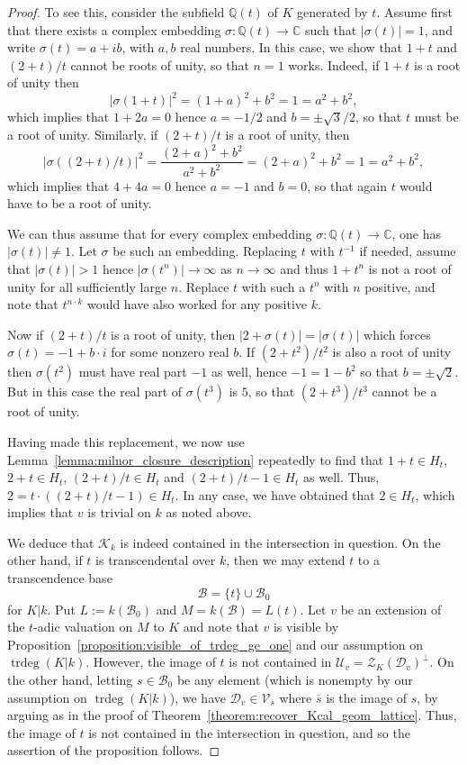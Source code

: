 \documentclass[12pt]{amsart}
\newcommand{\Qbb}{\mathbb{Q}}
\newcommand{\Cbb}{\mathbb{C}}
\newcommand{\trdeg}{\operatorname{trdeg}}
\newcommand{\Bcal}{\mathcal{B}}
\newcommand{\Vscr}{\mathscr{V}}
\newcommand{\Zcal}{\mathcal{Z}}
\newcommand{\Dcal}{\mathcal{D}}
\newcommand{\Ucal}{\mathcal{U}}
\newcommand{\Kcal}{\mathcal{K}}
\renewcommand{\bar}{\overline}
\theoremstyle{definition}
\begin{document}
\begin{proof}
  To see this, consider the subfield $\Qbb(t)$ of $K$ generated by $t$.
  Assume first that there exists a complex embedding $\sigma : \Qbb(t) \to \Cbb$ such that $|\sigma(t)| = 1$, and write $\sigma(t) = a + i b$, with $a,b$ real numbers.
  In this case, we show that $1 + t$ and $(2+t)/t$ cannot be roots of unity, so that $n = 1$ works.
  Indeed, if $1 + t$ is a root of unity then
  \[ |\sigma(1+t)|^{2} = (1+a)^{2} + b^{2} = 1 = a^{2} + b^{2}, \]
  which implies that $1 + 2a = 0$ hence $a = -1/2$ and $b = \pm \sqrt{3}/2$, so that $t$ must be a root of unity.
  Similarly, if $(2+t)/t$ is a root of unity, then
  \[ |\sigma((2+t)/t)|^{2} = \frac{(2+a)^{2} + b^{2}}{a^{2}+b^{2}} = (2+a)^{2} + b^{2} = 1 = a^{2} + b^{2}, \]
  which implies that $4 + 4a = 0$ hence $a = -1$ and $b = 0$, so that again $t$ would have to be a root of unity.

  We can thus assume that for every complex embedding $\sigma : \Qbb(t) \to \Cbb$, one has $|\sigma(t)| \neq 1$.
  Let $\sigma$ be such an embedding.
  Replacing $t$ with $t^{-1}$ if needed, assume that $|\sigma(t)| > 1$ hence $|\sigma(t^{n})| \to \infty$ as $n \to \infty$ and thus $1+t^{n}$ is not a root of unity for all sufficiently large $n$.
  Replace $t$ with such a $t^{n}$ with $n$ positive, and note that $t^{n \cdot k}$ would have also worked for any positive $k$.

  Now if $(2+t)/t$ is a root of unity, then $|2 + \sigma(t)| = |\sigma(t)|$ which forces $\sigma(t) = -1 + b \cdot i$ for some nonzero real $b$.
  If $(2+t^{2})/t^{2}$ is also a root of unity then $\sigma(t^{2})$ must have real part $-1$ as well, hence $-1 = 1 - b^{2}$ so that $b = \pm\sqrt{2}$.
  But in this case the real part of $\sigma(t^{3})$ is $5$, so that $(2 + t^{3})/t^{3}$ cannot be a root of unity.

  Having made this replacement, we now use Lemma~\ref{lemma:milnor_closure_description} repeatedly to find that $1 + t \in H_{t}$, $2 + t \in H_{t}$, $(2+t)/t \in H_{t}$ and $(2+t)/t-1 \in H_{t}$ as well.
  Thus, $2 = t \cdot ((2+t)/t - 1) \in H_{t}$.
  In any case, we have obtained that $2 \in H_{t}$, which implies that $v$ is trivial on $k$ as noted above.

  We deduce that $\Kcal_{k}$ is indeed contained in the intersection in question.
  On the other hand, if $t$ is transcendental over $k$, then we may extend $t$ to a transcendence base
  \[ \Bcal = \{t\} \cup \Bcal_{0} \]
  for $K|k$.
  Put $L := k(\Bcal_{0})$ and $M = k(\Bcal) = L(t)$.
  Let $v$ be an extension of the $t$-adic valuation on $M$ to $K$ and note that $v$ is visible by Proposition~\ref{proposition:visible_of_trdeg_ge_one} and our assumption on $\trdeg(K|k)$.
  However, the image of $t$ is not contained in $\Ucal_{v} = \Zcal_{K}(\Dcal_{v})^{\perp}$.
  On the other hand, letting $s \in \Bcal_{0}$ be any element (which is nonempty by our assumption on $\trdeg(K|k)$), we have $\Dcal_{v} \in \Vscr_{\bar s}$ where $\bar s$ is the image of $s$, by arguing as in the proof of Theorem~\ref{theorem:recover_Kcal_geom_lattice}.
  Thus, the image of $t$ is not contained in the intersection in question, and so the assertion of the proposition follows.
\end{proof}
\end{document}
